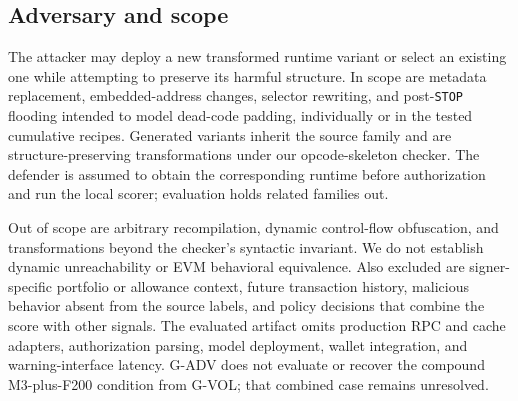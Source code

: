 \subsection{Adversary and scope}

The attacker may deploy a new transformed runtime variant or select an existing one while attempting to preserve its harmful structure. In scope are metadata replacement, embedded-address changes, selector rewriting, and post-\texttt{STOP} flooding intended to model dead-code padding, individually or in the tested cumulative recipes. Generated variants inherit the source family and are structure-preserving transformations under our opcode-skeleton checker. The defender is assumed to obtain the corresponding runtime before authorization and run the local scorer; evaluation holds related families out.

Out of scope are arbitrary recompilation, dynamic control-flow obfuscation, and transformations beyond the checker's syntactic invariant. We do not establish dynamic unreachability or EVM behavioral equivalence. Also excluded are signer-specific portfolio or allowance context, future transaction history, malicious behavior absent from the source labels, and policy decisions that combine the score with other signals. The evaluated artifact omits production RPC and cache adapters, authorization parsing, model deployment, wallet integration, and warning-interface latency. G-ADV does not evaluate or recover the compound M3-plus-F200 condition from G-VOL; that combined case remains unresolved.
